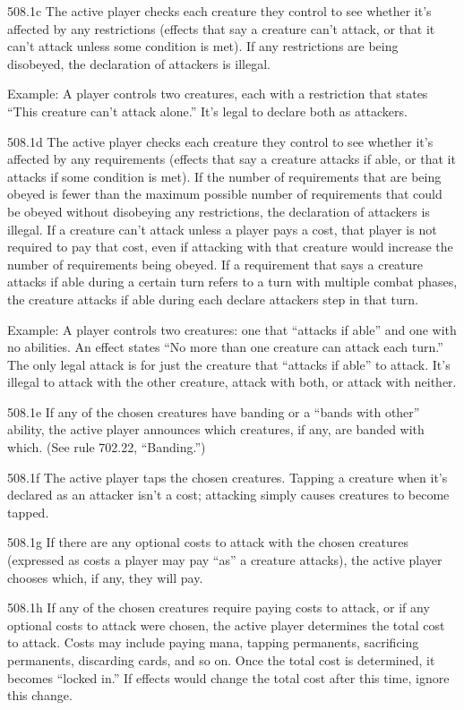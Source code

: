 508.1c The active player checks each creature they control to see whether it’s affected by any restrictions (effects that say a creature can’t attack, or that it can’t attack unless some condition is met). If any restrictions are being disobeyed, the declaration of attackers is illegal.

Example: A player controls two creatures, each with a restriction that states “This creature can’t attack alone.” It’s legal to declare both as attackers.

508.1d The active player checks each creature they control to see whether it’s affected by any requirements (effects that say a creature attacks if able, or that it attacks if some condition is met). If the number of requirements that are being obeyed is fewer than the maximum possible number of requirements that could be obeyed without disobeying any restrictions, the declaration of attackers is illegal. If a creature can’t attack unless a player pays a cost, that player is not required to pay that cost, even if attacking with that creature would increase the number of requirements being obeyed. If a requirement that says a creature attacks if able during a certain turn refers to a turn with multiple combat phases, the creature attacks if able during each declare attackers step in that turn.

Example: A player controls two creatures: one that “attacks if able” and one with no abilities. An effect states “No more than one creature can attack each turn.” The only legal attack is for just the creature that “attacks if able” to attack. It’s illegal to attack with the other creature, attack with both, or attack with neither.

508.1e If any of the chosen creatures have banding or a “bands with other” ability, the active player announces which creatures, if any, are banded with which. (See rule 702.22, “Banding.”)

508.1f The active player taps the chosen creatures. Tapping a creature when it’s declared as an attacker isn’t a cost; attacking simply causes creatures to become tapped.

508.1g If there are any optional costs to attack with the chosen creatures (expressed as costs a player may pay “as” a creature attacks), the active player chooses which, if any, they will pay.

508.1h If any of the chosen creatures require paying costs to attack, or if any optional costs to attack were chosen, the active player determines the total cost to attack. Costs may include paying mana, tapping permanents, sacrificing permanents, discarding cards, and so on. Once the total cost is determined, it becomes “locked in.” If effects would change the total cost after this time, ignore this change.

